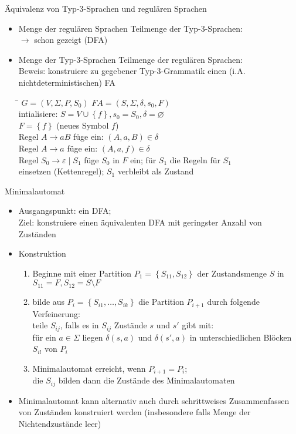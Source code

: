 \begin{frame}{Äquivalenz von Typ-3-Sprachen und regulären Sprachen}
	\begin{itemize}
		\item Menge der regulären Sprachen Teilmenge der Typ-3-Sprachen:\\
		\quad $\rightarrow$ schon gezeigt (DFA)
		\item Menge der Typ-3-Sprachen Teilmenge der regulären Sprachen:\\
		Beweis: konstruiere zu gegebener Typ-3-Grammatik einen (i.A. nichtdeterministischen) FA\\
		\begin{tabbing}
			\hspace{5cm}\=\kill
		$G=(V,\Sigma, P, S_0)$	\> $FA=(S, \Sigma, \delta, s_0, F)$\\ 
			\> intialisiere: $S=V \cup \left\{f\right\}, s_0=S_0, \delta=\varnothing$\\ 
			\> $F=\left\{f\right\}$ (neues Symbol $f$)\\ 
		Regel $A \rightarrow aB$	\> füge ein: $(A, a, B) \in \delta$\\ 
		Regel $A \rightarrow a$	\> füge ein: $(A, a, f) \in \delta$\\ 
		Regel $S_0 \rightarrow \varepsilon \mid S_1$	\> füge $S_0$ in $F$ ein; für $S_1$ die Regeln für $S_1$\\ 
			\> einsetzen (Kettenregel); $S_1$ verbleibt als Zustand
		\end{tabbing} 
	\end{itemize}
\end{frame}

\begin{frame}{Minimalautomat}
	\begin{itemize}
		\item Ausgangspunkt: ein DFA;\\
		Ziel: konstruiere einen äquivalenten DFA mit geringster Anzahl von Zuständen
		\item Konstruktion
		\begin{enumerate}
			\item Beginne mit einer Partition $P_1=\left\{S_{11}, S_{12}\right\}$ der Zustandsmenge $S$ in $S_{11}=F, S_{12}=S \setminus F$
			\item bilde aus $P_i=\left\{S_{i1},\ldots,S_{ik}\right\}$ die Partition $P_{i+1}$ durch folgende Verfeinerung:\\
			teile $S_{ij}$, falls es in $S_{ij}$ Zustände $s$ und $s'$ gibt mit:\\
			für ein $a \in \Sigma$ liegen $\delta(s, a)$ und $\delta(s', a)$ in unterschiedlichen Blöcken $S_{il}$ von $P_i$
			\item Minimalautomat erreicht, wenn $P_{i+1}=P_i$;\\
			die $S_{ij}$ bilden dann die Zustände des Minimalautomaten
		\end{enumerate}
		\item Minimalautomat kann alternativ auch durch schrittweises Zusammenfassen von Zuständen konstruiert werden (insbesondere falls Menge der Nichtendzustände leer)
	\end{itemize}
\end{frame}

